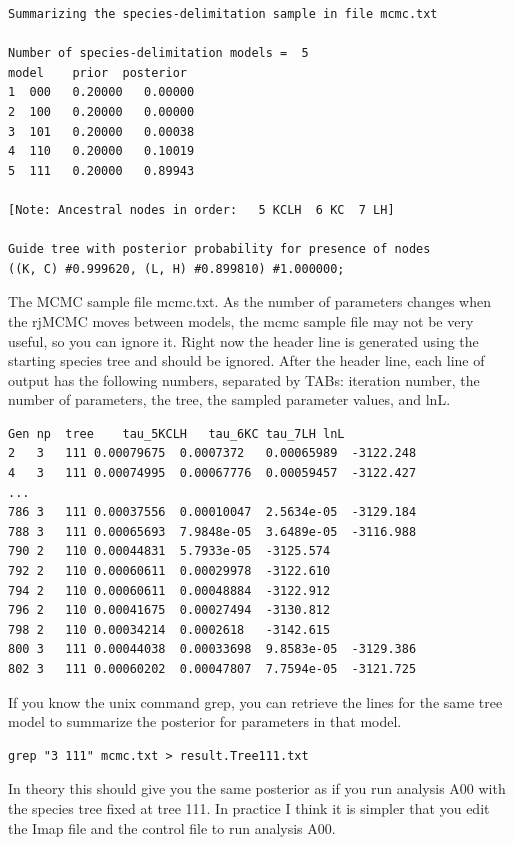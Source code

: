 \documentclass{book}
\numberwithin{equation}{section} \renewcommand{\baselinestretch}{0.55}
\begin{document}
\begin{verbatim}
Summarizing the species-delimitation sample in file mcmc.txt

Number of species-delimitation models =  5
model    prior  posterior
1  000   0.20000   0.00000
2  100   0.20000   0.00000
3  101   0.20000   0.00038
4  110   0.20000   0.10019
5  111   0.20000   0.89943

[Note: Ancestral nodes in order:   5 KCLH  6 KC  7 LH]

Guide tree with posterior probability for presence of nodes
((K, C) #0.999620, (L, H) #0.899810) #1.000000;
\end{verbatim}
The MCMC sample file mcmc.txt.  As the number of parameters changes
when the rjMCMC moves between models, the mcmc sample file may not be
very useful, so you can ignore it.  Right now the header line is
generated using the starting species tree and should be ignored.
After the header line, each line of output has the following numbers,
separated by TABs: iteration number, the number of parameters, the
tree, the sampled parameter values, and lnL.  {\small
\begin{verbatim}
Gen	np	tree	tau_5KCLH	tau_6KC	tau_7LH	lnL
2	3	111	0.00079675	0.0007372	0.00065989	-3122.248
4	3	111	0.00074995	0.00067776	0.00059457	-3122.427
...
786	3	111	0.00037556	0.00010047	2.5634e-05	-3129.184
788	3	111	0.00065693	7.9848e-05	3.6489e-05	-3116.988
790	2	110	0.00044831	5.7933e-05	-3125.574
792	2	110	0.00060611	0.00029978	-3122.610
794	2	110	0.00060611	0.00048884	-3122.912
796	2	110	0.00041675	0.00027494	-3130.812
798	2	110	0.00034214	0.0002618	-3142.615
800	3	111	0.00044038	0.00033698	9.8583e-05	-3129.386
802	3	111	0.00060202	0.00047807	7.7594e-05	-3121.725
\end{verbatim}
} If you know the unix command grep, you can retrieve the lines for
the same tree model to summarize the posterior for parameters in that
model.

{\small
\begin{verbatim}
grep "3 111" mcmc.txt > result.Tree111.txt
\end{verbatim}
} In theory this should give you the same posterior as if you run
analysis A00 with the species tree fixed at tree 111.  In practice I
think it is simpler that you edit the Imap file and the control file
to run analysis A00.
\end{document}
